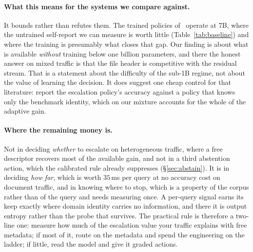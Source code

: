\documentclass[10pt,twocolumn]{article}
\theoremstyle{plain}
\begin{document}
\paragraph{What this means for the systems we compare against.} It bounds
rather than refutes them. The trained policies of~\cite{visionthink,
adaptvision, awares} operate at 7B, where the untrained self-report we can
measure is worth little (Table~\ref{tab:baseline}) and where the training is
presumably what closes that gap. Our finding is about what is available
\emph{without} training below one billion parameters, and there the honest
answer on mixed traffic is that the file header is competitive with the
residual stream. That is a statement about the difficulty of the sub-1B regime,
not about the value of learning the decision. It does suggest one cheap control
for that literature: report the escalation policy's accuracy against a policy
that knows only the benchmark identity, which on our mixture accounts for the
whole of the adaptive gain.

\paragraph{Where the remaining money is.} Not in deciding \emph{whether} to
escalate on heterogeneous traffic, where a free descriptor recovers most of the
available gain, and not in
a third abstention action, which the calibrated rule already suppresses
(\S\ref{sec:abstain}). It is in deciding \emph{how far}, which is worth
$35$\,ms per query at no accuracy cost on document traffic, and in knowing
where to stop, which is a property of the corpus rather than of the query and
needs measuring once. A per-query signal earns its keep exactly where domain
identity carries no information, and there it is output entropy rather than the
probe that survives. The practical rule is therefore a two-line one: measure
how much of the escalation value your traffic explains with free metadata; if
most of it, route on the metadata and spend the engineering on the ladder; if
little, read the model and give it graded actions.
\end{document}
